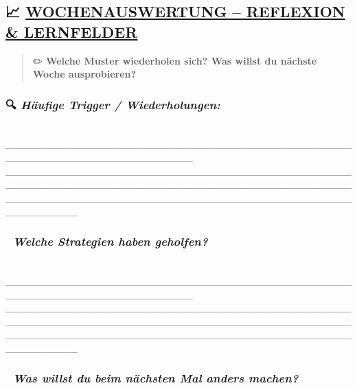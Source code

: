 \hypertarget{wochenauswertung-reflexion-lernfelder}{%
\subsection{\texorpdfstring{📈 \textbf{\ul{WOCHENAUSWERTUNG -- REFLEXION \& LERNFELDER}}}{📈 WOCHENAUSWERTUNG -- REFLEXION \& LERNFELDER}}\label{wochenauswertung-reflexion-lernfelder}}

\begin{quote}
✏️ \textbf{Welche Muster wiederholen sich? Was willst du nächste Woche ausprobieren?}
\end{quote}

\hypertarget{huxe4ufige-trigger-wiederholungen}{%
\subsubsection{\texorpdfstring{🔍 \emph{\textbf{Häufige Trigger / Wiederholungen:}}}{🔍 Häufige Trigger / Wiederholungen:}}\label{huxe4ufige-trigger-wiederholungen}}

🧠 \_\_\_\_\_\_\_\_\_\_\_\_\_\_\_\_\_\_\_\_\_\_\_\_\_\_\_\_\_\_\_\_\_\_\_\_\_\_\_\_\_\_\_\_\_\_\_\_\_\_\_\_\_\_\_\_\_\_\_\_\_\_\_\_\_\_\_\_\_\_\_\_\_\_ \_\_\_\_\_\_\_\_\_\_\_\_\_\_\_\_\_\_\_\_\_\_\_\_\_\_\_\_\_\_\_\_\_\_\_\_\_\_\_\_\_\_\_\_\_\_\_\_\_\_\_\_\_\_\_\_\_\_\_\_\_\_\_\_\_\_\_\_\_\_\_\_\_\_\_\_\_\_\_\_\_\_\_\_\_\_\_\_\_\_\_\_\_\_\_\_\_\_\_\_\_\_\_\_\_\_\_\_\_\_\_\_\_\_\_\_\_\_\_\_\_\_\_\_\_\_\_\_\_\_\_\_\_\_\_\_\_\_\_\_\_\_\_\_\_\_\_\_\_\_\_\_\_\_

\hypertarget{welche-strategien-haben-geholfen}{%
\subsubsection{\texorpdfstring{🔧 \emph{\textbf{Welche Strategien haben geholfen?}}}{🔧 Welche Strategien haben geholfen?}}\label{welche-strategien-haben-geholfen}}

🧠 \_\_\_\_\_\_\_\_\_\_\_\_\_\_\_\_\_\_\_\_\_\_\_\_\_\_\_\_\_\_\_\_\_\_\_\_\_\_\_\_\_\_\_\_\_\_\_\_\_\_\_\_\_\_\_\_\_\_\_\_\_\_\_\_\_\_\_\_\_\_\_\_\_\_ \_\_\_\_\_\_\_\_\_\_\_\_\_\_\_\_\_\_\_\_\_\_\_\_\_\_\_\_\_\_\_\_\_\_\_\_\_\_\_\_\_\_\_\_\_\_\_\_\_\_\_\_\_\_\_\_\_\_\_\_\_\_\_\_\_\_\_\_\_\_\_\_\_\_\_\_\_\_\_\_\_\_\_\_\_\_\_\_\_\_\_\_\_\_\_\_\_\_\_\_\_\_\_\_\_\_\_\_\_\_\_\_\_\_\_\_\_\_\_\_\_\_\_\_\_\_\_\_\_\_\_\_\_\_\_\_\_\_\_\_\_\_\_\_\_\_\_\_\_\_\_\_\_\_

\hypertarget{was-willst-du-beim-nuxe4chsten-mal-anders-machen}{%
\subsubsection{\texorpdfstring{🔁 \emph{\textbf{Was willst du beim nächsten Mal anders machen?}}}{🔁 Was willst du beim nächsten Mal anders machen?}}\label{was-willst-du-beim-nuxe4chsten-mal-anders-machen}}

